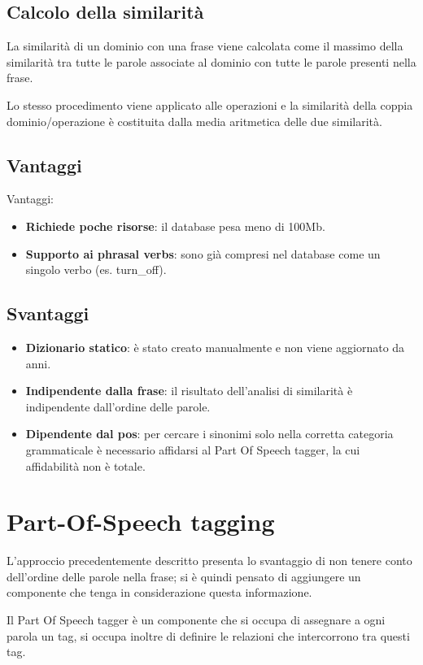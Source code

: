 \documentclass[twoside]{supsistudent}
\begin{document}
\subsection{Calcolo della similarità}
La similarità di un dominio con una frase viene calcolata come il massimo della similarità tra tutte le parole associate al dominio con tutte le parole presenti nella frase.

Lo stesso procedimento viene applicato alle operazioni e la similarità della coppia dominio/operazione è costituita dalla media aritmetica delle due similarità.
\subsection{Vantaggi}
Vantaggi:
 \begin{itemize}
  \item \textbf{Richiede poche risorse}: il database pesa meno di 100Mb.
  \item \textbf{Supporto ai phrasal verbs}: sono già compresi nel database come un singolo verbo (es. turn\_off).
\end{itemize}
\subsection{Svantaggi}
\begin{itemize}
  \item \textbf{Dizionario statico}: è stato creato manualmente e non viene aggiornato da anni.  
  \item \textbf{Indipendente dalla frase}: il risultato dell'analisi di similarità è indipendente dall'ordine delle parole.
  \item \textbf{Dipendente dal pos}: per cercare i sinonimi solo nella corretta categoria grammaticale è necessario affidarsi al Part Of Speech tagger, la cui affidabilità non è totale.
\end{itemize}
\newpage
\section{Part-Of-Speech tagging}
L'approccio precedentemente descritto presenta lo svantaggio di non tenere conto dell'ordine delle parole nella frase; si è quindi pensato di aggiungere un componente che tenga in considerazione questa informazione.

Il Part Of Speech tagger è un componente che si occupa di assegnare a ogni parola un tag, si occupa inoltre di definire le relazioni che intercorrono tra questi tag.\cite{pos}\cite{posCategories}
\end{document}
